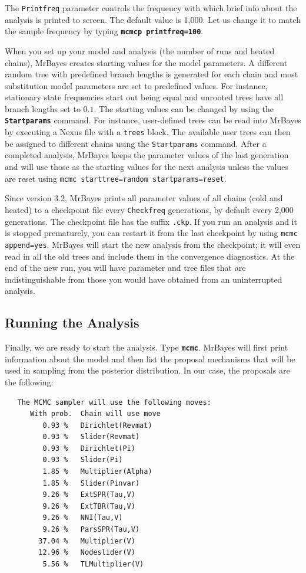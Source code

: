 \documentclass[12pt]{book}
\newcommand{\ttt}[1]{\texttt{#1}}
\newcommand{\tb}[1]{\ttt{\textbf{#1}}}
\begin{document}
The \ttt{Printfreq} parameter controls the frequency with which brief info about the analysis is
printed to screen. The default value is 1,000. Let us change it to match the sample frequency by
typing \tb{mcmcp printfreq=100}.

When you set up your model and analysis (the number of runs and heated chains), MrBayes creates
starting values for the model parameters. A different random tree with predefined branch lengths is
generated for each chain and most substitution model parameters are set to predefined values. For
instance, stationary state frequencies start out being equal and unrooted trees have all branch
lengths set to $0.1$. The starting values can be changed by using the \tb{Startparams} command.
For instance, user-defined trees can be read into MrBayes by executing a Nexus file with a
\ttt{trees} block. The available user trees can then be assigned to different chains using the
\ttt{Startparams} command. After a completed analysis, MrBayes keeps the parameter values of the
last generation and will use those as the starting values for the next analysis unless the values
are reset using \ttt{mcmc starttree=random startparams=reset}.

Since version 3.2, MrBayes prints all parameter values of all chains (cold and heated) to a
checkpoint file every \ttt{Checkfreq} generations, by default every 2,000 generations. The
checkpoint file has the suffix \ttt{.ckp}. If you run an analysis and it is stopped prematurely,
you can restart it from the last checkpoint by using \ttt{mcmc append=yes}. MrBayes will start the
new analysis from the checkpoint; it will even read in all the old trees and include them in the
convergence diagnostics. At the end of the new run, you will have parameter and tree files that are
indistinguishable from those you would have obtained from an uninterrupted analysis.

\subsection{Running the Analysis}

Finally, we are ready to start the analysis. Type \tb{mcmc}. MrBayes will first print information
about the model and then list the proposal mechanisms that will be used in sampling from the
posterior distribution. In our case, the proposals are the following:

\begin{singlespacing}
\footnotesize
\begin{verbatim}
   The MCMC sampler will use the following moves:
      With prob.  Chain will use move
         0.93 %   Dirichlet(Revmat)
         0.93 %   Slider(Revmat)
         0.93 %   Dirichlet(Pi)
         0.93 %   Slider(Pi)
         1.85 %   Multiplier(Alpha)
         1.85 %   Slider(Pinvar)
         9.26 %   ExtSPR(Tau,V)
         9.26 %   ExtTBR(Tau,V)
         9.26 %   NNI(Tau,V)
         9.26 %   ParsSPR(Tau,V)
        37.04 %   Multiplier(V)
        12.96 %   Nodeslider(V)
         5.56 %   TLMultiplier(V)
\end{verbatim}
\normalsize
\end{singlespacing}
\end{document}
